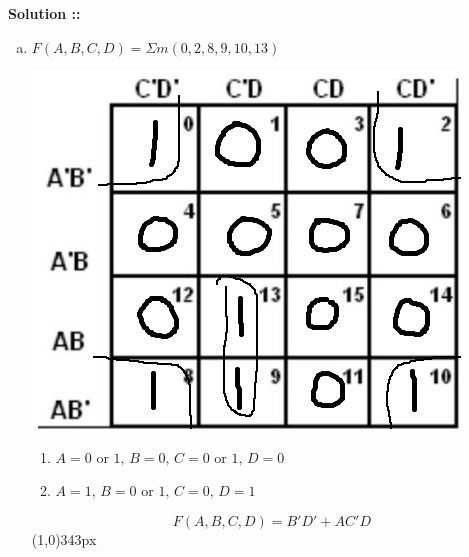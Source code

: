 \documentclass[11pt]{article}
\begin{document}
\vspace{5px}\textbf{Solution ::}
\begin{enumerate}[a)]
    \item
    $F(A,B,C,D) = \Sigma m(0,2,8,9,10,13)$
    \vspace{-15pt}\begin{center}
        \includegraphics[scale=0.35]{2a.png}
    \end{center}
    \vspace{-20pt}\begin{enumerate}[$\bullet$]
        \item $A=0$ or $1,\,B=0,\,C=0$ or $1,\,D=0$
        \item \vspace{-5pt}$A=1,\,B=0$ or $1,\,C=0,\,D=1$
    \end{enumerate}
    $$F(A,B,C,D) = B'D' + AC'D$$
    \line(1,0){343px}


\end{enumerate}
\end{document}
